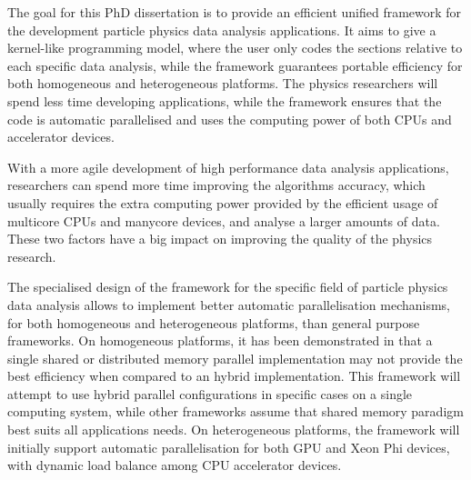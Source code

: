 The goal for this PhD dissertation is to provide an efficient unified framework for the development particle physics data analysis applications. It aims to give a kernel-like programming model, where the user only codes the sections relative to each specific data analysis, while the framework guarantees portable efficiency for both homogeneous and heterogeneous platforms. The physics researchers will spend less time developing applications, while the framework ensures that the code is automatic parallelised and uses the computing power of both CPUs and accelerator devices.

With a more agile development of high performance data analysis applications, researchers can spend more time improving the algorithms accuracy, which usually requires the extra computing power provided by the efficient usage of multicore CPUs and manycore devices, and analyse a larger amounts of data. These two factors have a big impact on improving the quality of the physics research.

The specialised design of the framework for the specific field of particle physics data analysis allows to implement better automatic parallelisation mechanisms, for both homogeneous and heterogeneous platforms, than general purpose frameworks. On homogeneous platforms, it has been demonstrated in \cite{paperAMP,Msc:AMP} that a single shared or distributed memory parallel implementation may not provide the best efficiency when compared to an hybrid implementation. This framework will attempt to use hybrid parallel configurations in specific cases on a single computing system, while other frameworks assume that shared memory paradigm best suits all applications needs. On heterogeneous platforms, the framework will initially support automatic parallelisation for both \nvidia GPU and \intel Xeon Phi devices, with dynamic load balance among CPU accelerator devices.
